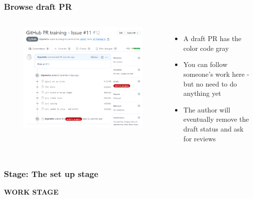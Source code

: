\documentclass[aspectratio=169]{beamer} %
\begin{document}
\begin{frame}
	\frametitle{Browse draft PR}
	\begin{columns}[c]
		
		\vspace{-.5cm}
		\begin{figure}
			\centering
			\includegraphics[width=\textwidth]{./img/create-pr-2.png}
		\end{figure}
		
		
		\begin{itemize}
			\setlength\itemsep{1em}
			\item A draft PR has the color code gray 
			\item You can follow someone's work here - but no need to do anything yet
			\item The author will eventually remove the draft status and ask for reviews
		\end{itemize}
		
	\end{columns}	
\end{frame}

\begin{frame}
	\frametitle{Stage: The set up stage}
	
	\huge\centering \textbf{WORK STAGE}
	
\end{frame}
\end{document}
